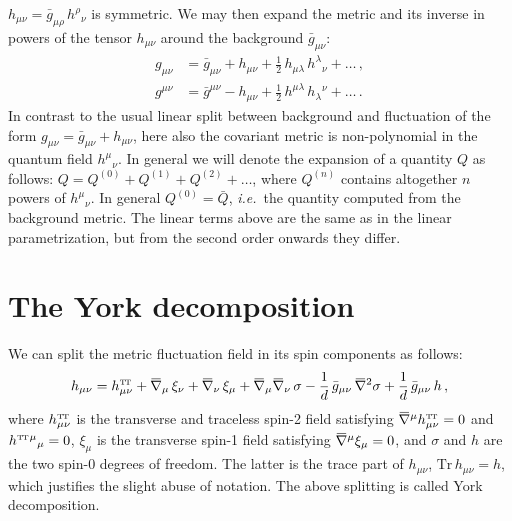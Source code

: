 \documentclass[11pt]{book} %
\newcommand{\overbar}[1]{\mkern 1.5mu\overline{\mkern-1.5mu#1\mkern-1.5mu}\mkern 1.5mu}
\newcommand\TTspace{ -1pt }
\newcommand\bgmunu{ \bar g_{\mu\nu} }
\newcommand\TT{ \scriptscriptstyle{\mathrm{T\hspace{\TTspace}T}} }
\newcommand\hTTmunu{ h^{\scriptscriptstyle{\mathrm{T\hspace{\TTspace}T}}}_{\mu\nu} }
\newcommand{\bnabla}{\overbar \nabla}
\newcommand\ie{\textit{i.e.}\ }
\newcommand{\Tr}{\mathrm{Tr}}
\numberwithin{equation}{chapter}
\begin{document}
\begin{appendices}
$h_{\mu\nu}=\bar g_{\mu\rho} \, h^\rho{}_\nu$ is symmetric.
We may then expand the metric and its inverse in powers of the tensor
$h_{\mu\nu}$ around the background $\bar g_{\mu\nu}$:
\begin{align}
  g_{\mu\nu} &= \bar g_{\mu\nu} + h_{\mu\nu}
              + \frac{1}{2} \, h_{\mu\lambda} \, h^\lambda{}_\nu + \ldots \,, \\
  g^{\mu\nu} &= \bar g^{\mu\nu}-h_{\mu\nu}
              + \frac{1}{2} \, h^{\mu\lambda} \, h_\lambda{}^\nu + \ldots \,.
\end{align}
In contrast to the usual linear split between background and fluctuation of the form
$g_{\mu\nu} = \bar g_{\mu\nu} + h_{\mu\nu}$, here also the covariant metric is
non-polynomial in the quantum field $h^\mu{}_\nu$.
In general we will denote the expansion of a quantity $Q$ as follows:
$Q=Q^{(0)}+Q^{(1)}+Q^{(2)}+\ldots$,
where $Q^{(n)}$ contains altogether $n$ powers of $h^\mu{}_\nu$.
In general $Q^{(0)}=\bar Q$, \ie the quantity computed from the background metric.
The linear terms above are the same as in the linear parametrization,
but from the second order onwards they differ.

\section{The York decomposition}

We can split the metric fluctuation field in its spin components as follows:
\begin{align}
  h_{\mu\nu} = \hTTmunu
             + \bnabla_\mu \, \xi_\nu
             + \bnabla_\nu \, \xi_\mu
             + \bnabla_\mu \bnabla_\nu \, \sigma
             - \frac{1}{d} \, \bgmunu \, \bnabla^2\sigma
             + \frac{1}{d} \, \bgmunu \, h \,,
  \label{eq:york_decomposition}
\end{align}
where $\hTTmunu$ is the transverse and traceless spin-2 field satisfying
$\bnabla^\mu \hTTmunu = 0$ and $h^{\TT}{}^\mu{}_\mu=0$, $\xi_\mu$ is the
transverse spin-1 field satisfying $\bnabla^\mu \xi_\mu=0$, and
$\sigma$ and $h$ are the two spin-0 degrees of freedom.
The latter is the trace part of $h_{\mu\nu}$, $\Tr \, h_{\mu\nu} = h$,
which justifies the slight abuse of notation. The above
splitting is called York decomposition.


\end{appendices}
\end{document}
